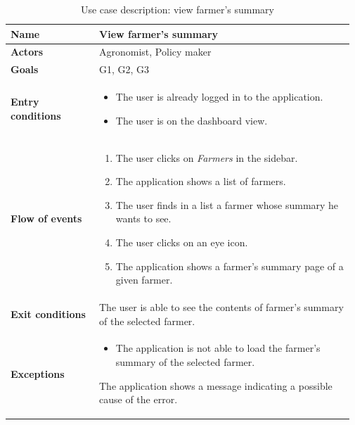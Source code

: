 \begin{table}[H]
    \centering
	\begin{tabular}{@{}p{0.25\linewidth} p{0.72\linewidth}@{}}
    \toprule
		\textbf{Name}               & View farmer's summary\\
		\midrule
		\textbf{Actors}             & Agronomist, Policy maker\\
		\midrule
		\textbf{Goals}              & G1, G2, G3 \\
		\midrule
		
		\textbf{Entry conditions}   & \begin{itemize}[leftmargin=.4cm,noitemsep,topsep=0pt,before=\vspace{-3mm},after=\vspace{-4mm}]
		    \item The user is already logged in to the application.
		    \item The user is on the dashboard view.
		\end{itemize}\\
		\midrule
		
		\textbf{Flow of events}     & \begin{enumerate}[leftmargin=.4cm,noitemsep,topsep=0pt,before=\vspace{-3mm},after=\vspace{-4mm}]
		    \item The user clicks on \textit{Farmers} in the sidebar.
		    \item The application shows a list of farmers.
		    \item The user finds in a list a farmer whose summary he wants to see.
		    \item The user clicks on an eye icon.
		    \item The application shows a farmer's summary page of a given farmer.
		\end{enumerate}\\
		\midrule
		\textbf{Exit conditions}    & The user is able to see the contents of farmer's summary of the selected farmer. \\
		\midrule
		
		\textbf{Exceptions}         & 
	    \begin{itemize}[leftmargin=.4cm,noitemsep,topsep=0pt,before=\vspace{-3mm}]
		   \item The application is not able to load the farmer's summary of the selected farmer.
		\end{itemize}
		The application shows a message indicating a possible cause of the error.
		\\\bottomrule
	\end{tabular}
	\caption{Use case description: view farmer's summary} 
\end{table}

